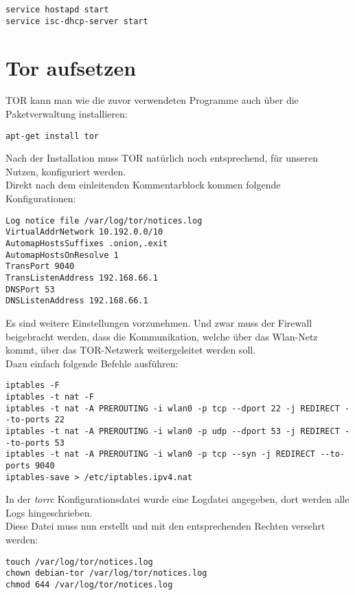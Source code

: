 \begin{lstlisting}
service hostapd start
service isc-dhcp-server start
\end{lstlisting}

\section{Tor aufsetzen}
TOR kann man wie die zuvor verwendeten Programme auch über die Paketverwaltung installieren:

\begin{lstlisting}
apt-get install tor
\end{lstlisting}

Nach der Installation muss TOR natürlich noch entsprechend, für unseren Nutzen, konfiguriert werden. \\
Direkt nach dem einleitenden Kommentarblock kommen folgende Konfigurationen:

\begin{lstlisting}
Log notice file /var/log/tor/notices.log
VirtualAddrNetwork 10.192.0.0/10
AutomapHostsSuffixes .onion,.exit
AutomapHostsOnResolve 1
TransPort 9040
TransListenAddress 192.168.66.1
DNSPort 53
DNSListenAddress 192.168.66.1
\end{lstlisting}

Es sind weitere Einstellungen vorzunehmen. Und zwar muss der Firewall beigebracht werden, dass die Kommunikation, welche über das Wlan-Netz kommt, über das TOR-Netzwerk weitergeleitet werden soll. \\
Dazu einfach folgende Befehle ausführen:


\begin{lstlisting}
iptables -F
iptables -t nat -F
iptables -t nat -A PREROUTING -i wlan0 -p tcp --dport 22 -j REDIRECT --to-ports 22
iptables -t nat -A PREROUTING -i wlan0 -p udp --dport 53 -j REDIRECT --to-ports 53
iptables -t nat -A PREROUTING -i wlan0 -p tcp --syn -j REDIRECT --to-ports 9040
iptables-save > /etc/iptables.ipv4.nat
\end{lstlisting}

In der \textit{torrc} Konfigurationsdatei wurde eine Logdatei angegeben, dort werden alle Logs hingeschrieben. \\
Diese Datei muss nun erstellt und mit den entsprechenden Rechten versehrt werden:

\begin{lstlisting}
touch /var/log/tor/notices.log
chown debian-tor /var/log/tor/notices.log
chmod 644 /var/log/tor/notices.log
\end{lstlisting}

